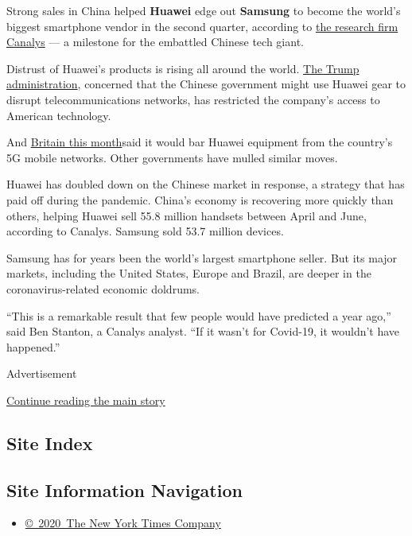 Strong sales in China helped \textbf{Huawei} edge out \textbf{Samsung}
to become the world's biggest smartphone vendor in the second quarter,
according to
\href{https://www.canalys.com/newsroom/Canalys-huawei-samsung-worldwide-smartphone-market-q2-2020}{the
research firm Canalys} --- a milestone for the embattled Chinese tech
giant.

Distrust of Huawei's products is rising all around the world.
\href{https://www.nytimes.com/2020/05/15/business/economy/commerce-department-huawei.html}{The
Trump administration}, concerned that the Chinese government might use
Huawei gear to disrupt telecommunications networks, has restricted the
company's access to American technology.

And
\href{https://www.nytimes.com/2020/07/14/business/huawei-uk-5g.html}{Britain
this month}said it would bar Huawei equipment from the country's 5G
mobile networks. Other governments have mulled similar moves.

Huawei has doubled down on the Chinese market in response, a strategy
that has paid off during the pandemic. China's economy is recovering
more quickly than others, helping Huawei sell 55.8 million handsets
between April and June, according to Canalys. Samsung sold 53.7 million
devices.

Samsung has for years been the world's largest smartphone seller. But
its major markets, including the United States, Europe and Brazil, are
deeper in the coronavirus-related economic doldrums.

``This is a remarkable result that few people would have predicted a
year ago,'' said Ben Stanton, a Canalys analyst. ``If it wasn't for
Covid-19, it wouldn't have happened.''

Advertisement

\protect\hyperlink{after-bottom}{Continue reading the main story}

\hypertarget{site-index}{%
\subsection{Site Index}\label{site-index}}

\hypertarget{site-information-navigation}{%
\subsection{Site Information
Navigation}\label{site-information-navigation}}

\begin{itemize}
\tightlist
\item
  \href{https://help.nytimes.com/hc/en-us/articles/115014792127-Copyright-notice}{©~2020~The
  New York Times Company}
\end{itemize}

